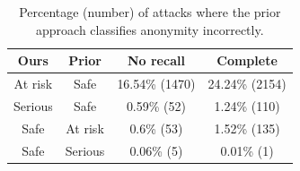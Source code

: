 
\begin{table}[t]
\begin{center}
\begin{small}
\begin{tabular}{cc|cc}
\toprule
 Ours & Prior & No recall & Complete \\
\midrule
At risk & Safe & 16.54\% (1470) & 24.24\% (2154) \\
Serious & Safe & 0.59\% (52) & 1.24\% (110) \\
Safe & At risk & 0.6\% (53) & 1.52\% (135) \\
Safe & Serious & 0.06\% (5) & 0.01\% (1) \\
\bottomrule
\end{tabular}
\caption{Percentage (number) of attacks where the prior approach classifies anonymity incorrectly.}
\label{tab:wrong_conclusion}
\end{small}
\end{center}
\end{table}
